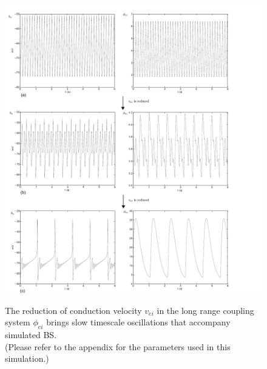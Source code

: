 \documentclass[a4paper,12pt]{article}
\begin{document}
\begin{figure}
	\includegraphics[scale=0.75]{frontiers-2012-working-images/figure-4-phi.pdf}
	\label{fig:phi_dyn}
	\caption{The reduction of conduction velocity $v_{ei}$ in the long range coupling system $\phi_{ei}$ brings slow timescale oscillations that accompany simulated BS. \\
(Please refer to the appendix for the parameters used in this simulation.)}
\end{figure}
\end{document}
